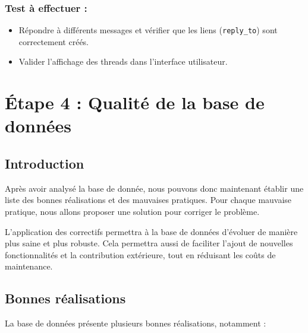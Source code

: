\documentclass[a4paper,11pt]{article}
\begin{document}
\subsubsection*{Test à effectuer :}
\begin{itemize}
    \item Répondre à différents messages et vérifier que les liens (\texttt{reply\_to}) sont correctement créés.
    \item Valider l’affichage des threads dans l’interface utilisateur.
\end{itemize}

\section*{Étape 4 : Qualité de la base de données}

\subsection*{Introduction}

Après avoir analysé la base de donnée, nous pouvons donc maintenant établir une liste des bonnes réalisations et des mauvaises pratiques. Pour chaque  mauvaise pratique, nous allons proposer une solution pour corriger le problème.

L'application des correctifs permettra à la base de données d'évoluer de manière plus saine et plus robuste. Cela permettra aussi de faciliter l'ajout de nouvelles fonctionnalités et la contribution extérieure, tout en réduisant les coûts de maintenance.

\subsection*{Bonnes réalisations}

La base de données présente plusieurs bonnes réalisations, notamment :
\end{document}
